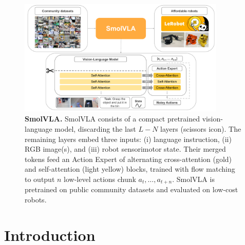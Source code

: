 

\begin{figure}[h]
    \centering
    \begin{minipage}[t]{1\textwidth}
        \centering
        \includegraphics[width=0.88\textwidth]{figures/SmolVLA.pdf}
        \caption{\footnotesize \textbf{SmolVLA.} SmolVLA consists of a compact pretrained vision-language model, discarding the last $L-N$ layers (scissors icon). The remaining layers embed three inputs: (i) language instruction, (ii) RGB image(s), and (iii) robot sensorimotor state. Their merged tokens feed an Action Expert of alternating cross-attention (gold) and self-attention (light yellow) blocks, trained with flow matching to output $n$ low-level actions chunk $a_t, \dots, a_{t+n}$. SmolVLA is pretrained on public community datasets and evaluated on low-cost robots.
        }
        \label{fig:arch}
    \end{minipage}
    \vspace{-0.6cm}
\end{figure}



\section{Introduction}

